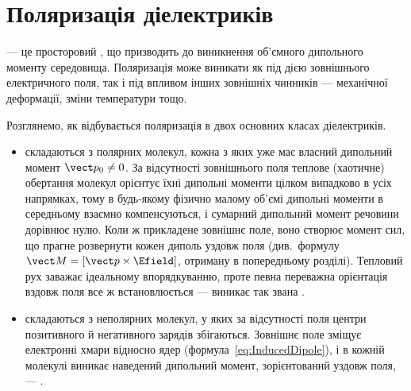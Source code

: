 \section{Поляризація діелектриків}

\begin{Attention}
	 --- це просторовий , що призводить до виникнення об'ємного дипольного моменту
	середовища. Поляризація може виникати як під дією зовнішнього електричного поля, так і під впливом інших зовнішніх чинників --- механічної
	деформації, зміни температури тощо.
\end{Attention}

Розглянемо, як відбувається поляризація в двох основних класах діелектриків.

\begin{itemize}
	\item {} складаються з полярних молекул, кожна з яких уже має власний дипольний момент $\vect p_0 \neq 0$. За
	      відсутності зовнішнього поля теплове (хаотичне) обертання молекул орієнтує їхні дипольні моменти цілком випадково в усіх напрямках, тому в
	      будь-якому фізично малому об'ємі дипольні моменти в середньому взаємно компенсуються, і сумарний дипольний момент речовини дорівнює нулю.
	      Коли ж прикладене зовнішнє поле, воно створює момент сил, що прагне розвернути кожен диполь уздовж поля (див.~формулу
	      $\vect M = [\vect p\times\Efield]$, отриману в попередньому розділі). Тепловий рух заважає ідеальному впорядкуванню, проте певна переважна
	      орієнтація вздовж поля все ж встановлюється --- виникає так звана .
	\item {} складаються з неполярних молекул, у яких за відсутності поля центри позитивного й негативного зарядів
	      збігаються. Зовнішнє поле зміщує електронні хмари відносно ядер (формула~\eqref{eq:InducedDipole}), і в кожній молекулі виникає наведений
	      дипольний момент, зорієнтований уздовж поля, --- .
\end{itemize}


